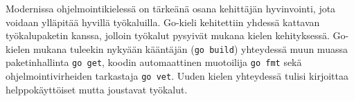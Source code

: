 %

Modernissa ohjelmointikielessä on tärkeänä osana kehittäjän hyvinvointi, jota
voidaan ylläpitää hyvillä työkaluilla. Go-kieli kehitettiin yhdessä kattavan
työkalupaketin kanssa, jolloin työkalut pysyivät mukana kielen kehityksessä.
Go-kielen mukana tuleekin nykyään kääntäjän (\texttt{go build}) yhteydessä muun
muassa paketinhallinta \texttt{go get}, koodin automaattinen muotoilija
\texttt{go fmt} sekä ohjelmointivirheiden tarkastaja \texttt{go vet}. Uuden
kielen yhteydessä tulisi kirjoittaa helppokäyttöiset mutta joustavat työkalut.




%
